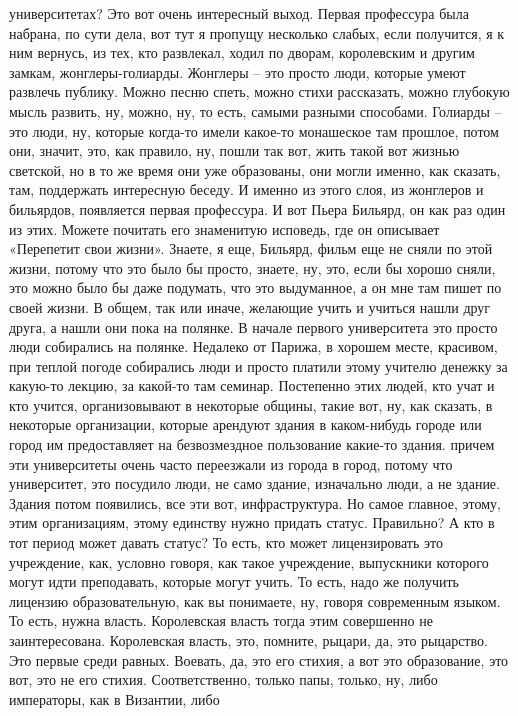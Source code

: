 университетах? Это вот очень интересный выход. Первая профессура была набрана,
по сути дела, вот тут я пропущу несколько слабых, если получится, я к ним
вернусь, из тех, кто развлекал, ходил по дворам, королевским и другим замкам,
жонглеры-голиарды. Жонглеры – это просто люди, которые умеют развлечь публику.
Можно песню спеть, можно стихи рассказать, можно глубокую мысль развить, ну,
можно, ну, то есть, самыми разными способами. Голиарды – это люди, ну, которые
когда-то имели какое-то монашеское там прошлое, потом они, значит, это, как
правило, ну, пошли так вот, жить такой вот жизнью светской, но в то же время они
уже образованы, они могли именно, как сказать, там, поддержать интересную
беседу. И именно из этого слоя, из жонглеров и бильярдов, появляется первая
профессура. И вот Пьера Бильярд, он как раз один из этих. Можете почитать его
знаменитую исповедь, где он описывает «Перепетит свои жизни». Знаете, я еще,
Бильярд, фильм еще не сняли по этой жизни, потому что это было бы просто,
знаете, ну, это, если бы хорошо сняли, это можно было бы даже подумать, что это
выдуманное, а он мне там пишет по своей жизни. В общем, так или иначе, желающие
учить и учиться нашли друг друга, а нашли они пока на полянке. В начале первого
университета это просто люди собирались на полянке. Недалеко от Парижа, в
хорошем месте, красивом, при теплой погоде собирались люди и просто платили
этому учителю денежку за какую-то лекцию, за какой-то там семинар. Постепенно
этих людей, кто учат и кто учится, организовывают в некоторые общины, такие вот,
ну, как сказать, в некоторые организации, которые арендуют здания в каком-нибудь
городе или город им предоставляет на безвозмездное пользование какие-то здания.
причем эти университеты очень часто переезжали из города в город, потому что
университет, это посудило люди, не само здание, изначально люди, а не здание.
Здания потом появились, все эти вот, инфраструктура. Но самое главное, этому,
этим организациям, этому единству нужно придать статус. Правильно? А кто в тот
период может давать статус? То есть, кто может лицензировать это учреждение,
как, условно говоря, как такое учреждение, выпускники которого могут идти
преподавать, которые могут учить. То есть, надо же получить лицензию
образовательную, как вы понимаете, ну, говоря современным языком. То есть, нужна
власть. Королевская власть тогда этим совершенно не заинтересована. Королевская
власть, это, помните, рыцари, да, это рыцарство. Это первые среди равных.
Воевать, да, это его стихия, а вот это образование, это вот, это не его стихия.
Соответственно, только папы, только, ну, либо императоры, как в Византии, либо
